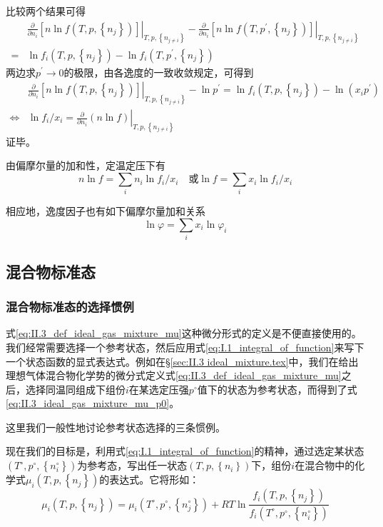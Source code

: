 \documentclass[main.tex]{subfiles}
\begin{document}
比较两个结果可得
\begin{align*}
      & \left.\frac{\partial}{\partial n_i}\left[n\ln f\left(T,p,\left\{n_j\right\}\right)\right]\right|_{T,p,\left\{n_{j\neq i}\right\}}-\left.\frac{\partial}{\partial n_i}\left[n\ln f\left(T,p^\prime,\left\{n_j\right\}\right)\right]\right|_{T,p,\left\{n_{j\neq i}\right\}} \\
    = & \ln f_i\left(T,p,\left\{n_j\right\}\right)-\ln f_i\left(T,p^\prime,\left\{n_j\right\}\right)
\end{align*}
两边求$p^\prime\rightarrow 0$的极限，由各逸度的一致收敛规定，可得到
\begin{align*}
                    & \left.\frac{\partial}{\partial n_i}\left[n\ln f\left(T,p,\left\{n_j\right\}\right)\right]\right|_{T,p,\left\{n_{j\neq i}\right\}}-\ln p^\prime=\ln f_i\left(T,p,\left\{n_j\right\}\right)-\ln\left(x_ip^\prime\right) \\
    \Leftrightarrow & \ln f_i/x_i=\left.\frac{\partial}{\partial n_i}\left(n\ln f\right)\right|_{T,p,\left\{n_{j\neq i}\right\}}
\end{align*}
证毕。

由偏摩尔量的加和性，定温定压下有
\[n\ln f=\sum_i n_i\ln f_i/x_i\quad\text{或}\ln f=\sum_ix_i\ln f_i/x_i\]

相应地，逸度因子也有如下偏摩尔量加和关系
\[\ln \varphi=\sum_ix_i\ln\varphi_i\]

\subsection{混合物标准态}
\subsubsection{混合物标准态的选择惯例}
式\eqref{eq:II.3_def_ideal_gas_mixture_mu}这种微分形式的定义是不便直接使用的。我们经常需要选择一个参考状态，然后应用式\eqref{eq:I.1_integral_of_function}来写下一个状态函数的显式表达式。例如在\S\ref{sec:II.3 ideal_mixture.tex}中，我们在给出理想气体混合物化学势的微分式定义式\eqref{eq:II.3_def_ideal_gas_mixture_mu}之后，选择同温同组成下组份$i$在某选定压强$p^\circ$值下的状态为参考状态，而得到了式\eqref{eq:II.3_ideal_gas_mixture_mu_p0}。

这里我们一般性地讨论参考状态选择的三条惯例。

现在我们的目标是，利用式\eqref{eq:I.1_integral_of_function}的精神，通过选定某状态$\left(T^\circ,p^\circ,\left\{n_i^\circ\right\}\right)$为参考态，写出任一状态$\left(T,p,\left\{n_i\right\}\right)$下，组份$i$在混合物中的化学式$\mu_i\left(T,p,\left\{n_j\right\}\right)$的表达式。它将形如：
\begin{equation*}
    \mu_i\left(T,p,\left\{n_j\right\}\right)=\mu_i\left(T^\circ,p^\circ,\left\{n_j^\circ\right\}\right)+RT\ln\frac{f_i\left(T,p,\left\{n_j\right\}\right)}{f_i\left(T^\circ,p^\circ,\left\{n_i^\circ\right\}\right)}
\end{equation*}
\end{document}
